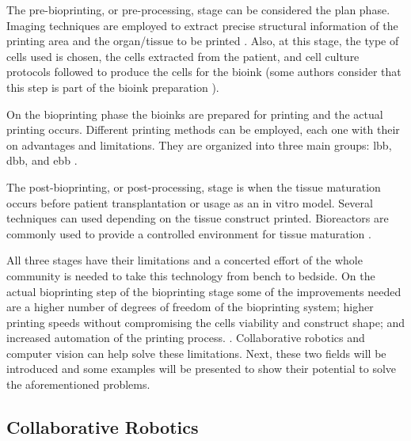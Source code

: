 The pre-bioprinting, or pre-processing, stage can be considered the plan phase. Imaging techniques are employed to extract precise structural information of the printing area and the organ/tissue to be printed \cite{Datta2018_essential_steps_bioprinting, Vijayavenkataraman2018_bioprinting_tissues_organs_regen_med}. Also, at this stage, the type of cells used is chosen, the cells extracted from the patient, and cell culture protocols followed to produce the cells for the bioink (some authors consider that this step is part of the bioink preparation \cite{Vijayavenkataraman2018_bioprinting_tissues_organs_regen_med}). 

On the bioprinting phase the bioinks are prepared for printing and the actual printing occurs. Different printing methods can be employed, each one with their on advantages and limitations. They are organized into three main groups: \gls{lbb}, \gls{dbb}, and \gls{ebb} \cite{Datta2018_essential_steps_bioprinting, Vijayavenkataraman2018_bioprinting_tissues_organs_regen_med}. 

The post-bioprinting, or post-processing, stage is when the tissue maturation occurs before patient transplantation or usage as an in vitro model. Several techniques can used depending on the tissue construct printed. Bioreactors are commonly used to provide a controlled environment for tissue maturation \cite{Datta2018_essential_steps_bioprinting, Vijayavenkataraman2018_bioprinting_tissues_organs_regen_med}.

All three stages have their limitations and a concerted effort of the whole community is needed to take this technology from bench to bedside. On the actual bioprinting step of the bioprinting stage some of the improvements needed are a higher number of degrees of freedom of the bioprinting system; higher printing speeds without compromising the cells viability and construct shape; and increased automation of the printing process. \cite{Ozbolat2017_evaluation_bioprinter_tech, Datta2018_essential_steps_bioprinting}. Collaborative robotics and computer vision can help solve these limitations. Next, these two fields will be introduced and some examples will be presented to show their potential to solve the aforementioned problems.


\subsection{Collaborative Robotics} %
\label{subsec:collaborative_robotics}

